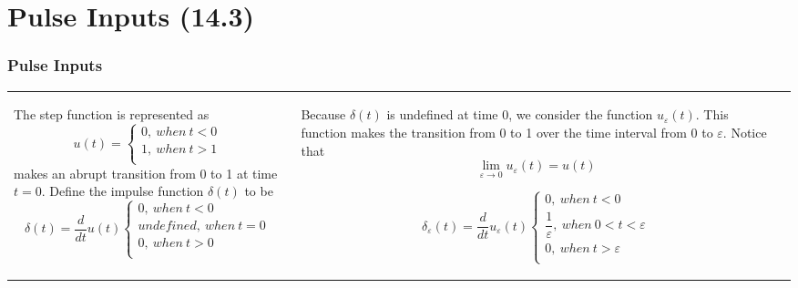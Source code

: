 \documentclass[aspectratio=169]{beamer}
\begin{document}
\section{Pulse Inputs (14.3)}
\begin{frame}[fragile]
	\frametitle{Pulse Inputs}
\begin{tabular}{ll}

	\begin{columns}
		\begin{column}{0.5\textwidth}  %
The step function is represented as
$$
	    u(t)=
	    \begin{cases}
	    0, \ when \ t < 0 \\
	    1, \ when \ t > 1 \\
	    
	    \end{cases}
	    $$
makes an abrupt transition from 0 to 1 at time $t=0$. 
Define the impulse function $\delta (t)$ to be
$$
	    \delta (t)= \dfrac{d}{dt}u(t)
	    \begin{cases}
	    0, \ when \ t < 0 \\
	    undefined, \ when \ t = 0 \\
	    0, \ when \ t > 0 \\	    
	    \end{cases}
	    $$

		\end{column}
		\begin{column}{0.5\textwidth}  %
Because $\delta(t)$ is undefined at time 0, we consider the function $u_{\varepsilon}(t)$. This
function makes the transition from 0 to 1 over the time interval from 0 to $\varepsilon$. Notice that
$$\lim_{\varepsilon \to 0} u_{\varepsilon}(t)=u(t)$$

$$
	    \delta_{\varepsilon} (t)= \dfrac{d}{dt}u_{\varepsilon}(t)
	    \begin{cases}
	    0, \ when \ t < 0 \\
	    \dfrac{1}{\varepsilon}, \ when \ 0 < t < \varepsilon \\
	    0, \ when \ t > \varepsilon\\	    
	    \end{cases}
	    $$

		\end{column}
	\end{columns}\\	
\end{tabular}
\end{frame}
\end{document}
